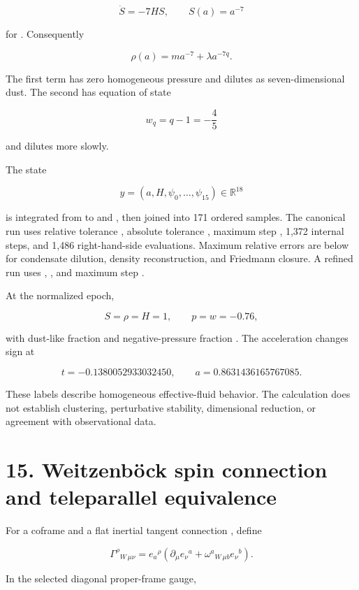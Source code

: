 \documentclass[11pt]{article}
\begin{document}
\[
\dot S=-7HS,
\qquad
S(a)=a^{-7}
\]

for \texttt{}. Consequently

\[
\rho(a)=ma^{-7}+\lambda a^{-7q}.
\]

The first term has zero homogeneous pressure and dilutes as seven-dimensional dust. The second has equation of state

\[
w_q=q-1=-\frac45
\]

and dilutes more slowly.

The state

\[
y=(a,H,\psi_0,\ldots,\psi_{15})\in\mathbb R^{18}
\]

is integrated from \texttt{} to \texttt{} and \texttt{}, then joined into 171 ordered samples. The canonical run uses relative tolerance \texttt{}, absolute tolerance \texttt{}, maximum step \texttt{}, 1,372 internal steps, and 1,486 right-hand-side evaluations. Maximum relative errors are below \texttt{} for condensate dilution, density reconstruction, and Friedmann closure. A refined run uses \texttt{}, \texttt{}, and maximum step \texttt{}.

At the normalized epoch,

\[
S=\rho=H=1,
\qquad
p=w=-0.76,
\]

with dust-like fraction \texttt{} and negative-pressure fraction \texttt{}. The acceleration changes sign at

\[
t=-0.1380052933032450,
\qquad
a=0.8631436165767085.
\]

These labels describe homogeneous effective-fluid behavior. The calculation does not establish clustering, perturbative stability, dimensional reduction, or agreement with observational data.

\section{15. Weitzenböck spin connection and teleparallel equivalence}

For a coframe \texttt{} and a flat inertial tangent connection \texttt{}, define

\[
\Gamma^\rho{}_{W\,\mu\nu}
=e_a{}^\rho\left(
\partial_\mu e_\nu{}^a
+\omega^a{}_{W\,\mu b}e_\nu{}^b\right).
\]

In the selected diagonal proper-frame gauge,
\end{document}
